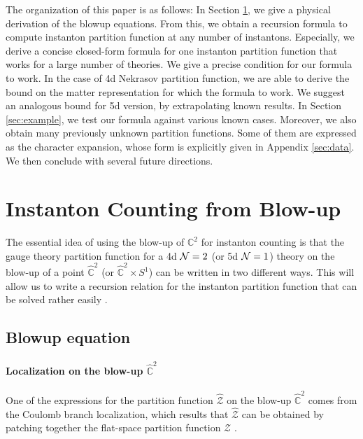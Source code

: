 \documentclass[letterpaper, 11pt]{article}
\def\IC{\mathbb{C}}
\def\CN{{\cal N}}
\begin{document}
The organization of this paper is as follows: In Section \ref{sec:blowup}, we give a physical derivation of the blowup equations. From this, we obtain a recursion formula to compute instanton partition function at any number of instantons. Especially, we derive a concise closed-form formula for one instanton partition function that works for a large number of theories. We give a precise condition for our formula to work. In the case of 4d Nekrasov partition function, we are able to derive the bound on the matter representation for which the formula to work. We suggest an analogous bound for 5d version, by extrapolating known results. In Section \ref{sec:example}, we test our formula against various known cases. Moreover, we also obtain many previously unknown partition functions. Some of them are expressed as the character expansion, whose form is explicitly given in Appendix \ref{sec:data}. We then conclude with several future directions.


\section{Instanton Counting from Blow-up} \label{sec:blowup}



The essential idea of using the blow-up of ${\IC}^2$ for instanton counting is that the gauge theory partition function for a 4d $\CN=2$ (or 5d $\CN=1$) theory on the blow-up of a point $\hat{\IC}^2$ (or $\hat{\IC}^2 \times S^1$) can be written in two different ways. This will allow us to write a recursion relation for the instanton partition function that can be solved rather easily \cite{Nakajima:2003pg, Nakajima:2003uh,Nakajima:2005fg, Keller:2012da}. 




\subsection{Blowup equation}

\paragraph{Localization on the blow-up $\hat{\IC}^2$}

One of the expressions for the partition function $\hat{\mathcal{Z}}$ on the blow-up $\hat{\IC}^2$ comes from the Coulomb branch localization, which results that $\hat{\mathcal{Z}}$ can be obtained by patching together the flat-space partition function $\mathcal Z$ \cite{Nekrasov:2003vi}.
\end{document}

